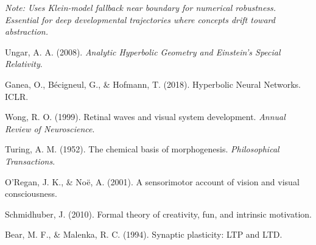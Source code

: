 \documentclass[10pt]{article}
\begin{document}
\textit{Note: Uses Klein-model fallback near boundary for numerical robustness. Essential for deep developmental trajectories where concepts drift toward abstraction.}

\begin{thebibliography}{9}

Ungar, A. A. (2008). \textit{Analytic Hyperbolic Geometry and Einstein's Special Relativity}.

Ganea, O., Bécigneul, G., \& Hofmann, T. (2018). Hyperbolic Neural Networks. ICLR.

Wong, R. O. (1999). Retinal waves and visual system development. \textit{Annual Review of Neuroscience}.

Turing, A. M. (1952). The chemical basis of morphogenesis. \textit{Philosophical Transactions}.

O'Regan, J. K., \& Noë, A. (2001). A sensorimotor account of vision and visual consciousness.

Schmidhuber, J. (2010). Formal theory of creativity, fun, and intrinsic motivation.

Bear, M. F., \& Malenka, R. C. (1994). Synaptic plasticity: LTP and LTD.

\end{thebibliography}
\end{document}
